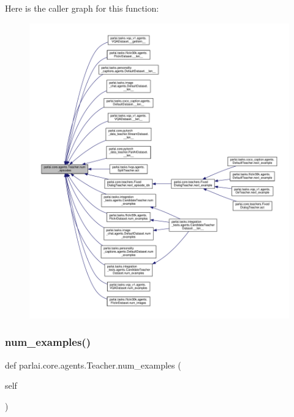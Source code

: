 Here is the caller graph for this function\+:
\nopagebreak
\begin{figure}[H]
\begin{center}
\leavevmode
\includegraphics[width=350pt]{classparlai_1_1core_1_1agents_1_1Teacher_aa35e171610f8dd8e6a2fd5a87ad91e10_icgraph}
\end{center}
\end{figure}
\mbox{\label{classparlai_1_1core_1_1agents_1_1Teacher_a93370e4e99236e8ad267b40cd4437920}} 
\subsubsection{\texorpdfstring{num\+\_\+examples()}{num\_examples()}}
{\footnotesize\ttfamily def parlai.\+core.\+agents.\+Teacher.\+num\+\_\+examples (\begin{DoxyParamCaption}\item[{}]{self }\end{DoxyParamCaption})}

